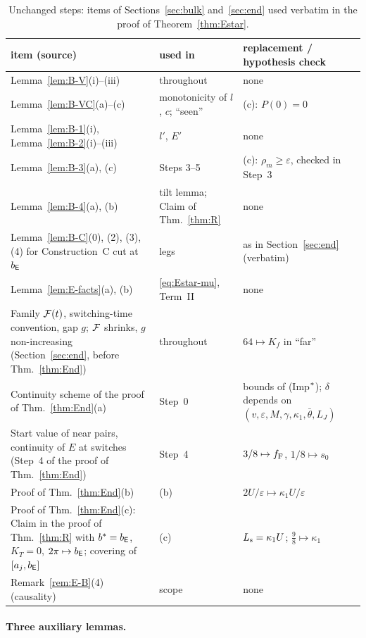 \begin{table}[htbp]
\centering\small
\begin{tabular}{@{}p{5.4cm}p{3.6cm}p{6.2cm}@{}}
\toprule
item (source) & used in & replacement / hypothesis check\\
\midrule
Lemma~\ref{lem:B-V}(i)--(iii) & throughout & none\\
Lemma~\ref{lem:B-VC}(a)--(c) & monotonicity of $l$, $c$; ``seen'' & (c): $P(0)=0$\\
Lemma~\ref{lem:B-1}(i), Lemma~\ref{lem:B-2}(i)--(iii) & $l'$, $E'$ & none\\
Lemma~\ref{lem:B-3}(a), (c) & Steps 3--5 & (c): $\rho_m\ge\varepsilon$, checked in Step~3\\
Lemma~\ref{lem:B-4}(a), (b) & tilt lemma; Claim of Thm.~\ref{thm:R} & none\\
Lemma~\ref{lem:B-C}(0), (2), (3), (4) for Construction~C cut at $b_{\mathsf E}$ & legs & as in Section~\ref{sec:end} (verbatim)\\
Lemma~\ref{lem:E-facts}(a), (b) & \eqref{eq:Estar-mu}, Term~II & none\\
Family $\mathcal F(t)$, switching-time convention, gap $g$; $\mathcal F$ shrinks, $g$ non-increasing (Section~\ref{sec:end}, before
Thm.~\ref{thm:End}) & throughout & $64\mapsto K_f$ in ``far''\\
Continuity scheme of the proof of Thm.~\ref{thm:End}(a) & Step~0 & bounds of (Imp$^{*}$); $\delta$ depends on
$(v,\varepsilon,M,\gamma,\kappa_1,\bar\theta,L_J)$\\
Start value of near pairs, continuity of $E$ at switches (Step~4 of the proof of Thm.~\ref{thm:End}) & Step~4 & $3/8\mapsto f_{\mathrm F}$,
$1/8\mapsto s_0$\\
Proof of Thm.~\ref{thm:End}(b) & (b) & $2U/\varepsilon\mapsto\kappa_1U/\varepsilon$\\
Proof of Thm.~\ref{thm:End}(c): Claim in the proof of Thm.~\ref{thm:R} with $b^*=b_{\mathsf E}$, $K_T=0$, $2\pi\mapsto b_{\mathsf E}$; covering of
$[a_j,b_{\mathsf E}]$ & (c) & $L_{\mathrm s}=\kappa_1U$; $\frac98\mapsto\kappa_1$\\
Remark~\ref{rem:E-B}(4) (causality) & scope & none\\
\bottomrule
\end{tabular}
\caption{Unchanged steps: items of Sections~\ref{sec:bulk} and~\ref{sec:end} used verbatim in the proof of
Theorem~\ref{thm:Estar}.}\label{tab:Estar-unch}
\end{table}

\paragraph{Three auxiliary lemmas.}

